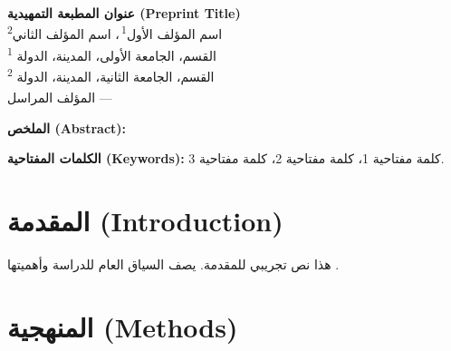 \documentclass[11pt,a4paper]{article}
\begin{document}
\thispagestyle{fancy}

\begin{center}
{\LARGE\bfseries عنوان المطبعة التمهيدية (Preprint Title)}\\[1.2em]
{\large
اسم المؤلف الأول\textsuperscript{1}\,\textsuperscript{\dag}،
اسم المؤلف الثاني\textsuperscript{2}
}\\[0.6em]
{\small
\textsuperscript{1} القسم، الجامعة الأولى، المدينة، الدولة\\
\textsuperscript{2} القسم، الجامعة الثانية، المدينة، الدولة
}\\[0.6em]
{\footnotesize
\textsuperscript{\dag} المؤلف المراسل --- \\
}
\end{center}

\vspace{0.5em}

\begin{center}
\begin{minipage}{0.9\textwidth}
\noindent\textbf{الملخص (Abstract):}

\vspace{0.5em}
\noindent\textbf{الكلمات المفتاحية (Keywords):} كلمة مفتاحية 1، كلمة مفتاحية 2، كلمة مفتاحية 3.
\end{minipage}
\end{center}

\vspace{1em}


\section{المقدمة (Introduction)}
\label{sec:intro}

هذا نص تجريبي للمقدمة. يصف السياق العام للدراسة وأهميتها \cite{example_article}.

\section{المنهجية (Methods)}
\label{sec:methods}
\end{document}
